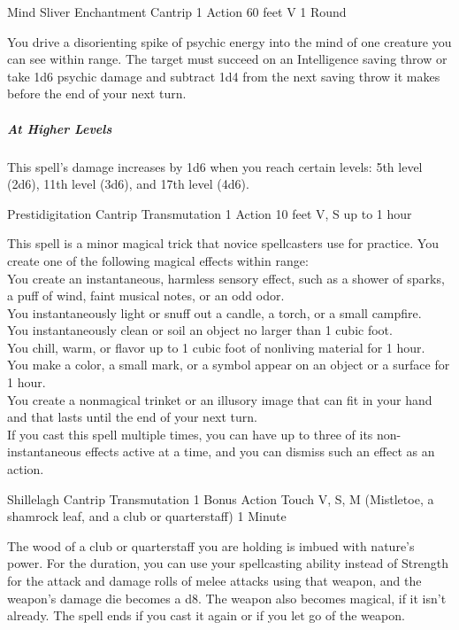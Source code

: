 \documentclass[letterpaper,openany,oneside,twocolumn]{book}
\begin{document}
\DndSpellHeader
  {Mind Sliver}
  {Enchantment Cantrip}
  {1 Action}
  {60 feet}
  {V}
  {1 Round}
  
You drive a disorienting spike of psychic energy into the mind of one creature you can see within range. The target must succeed on an Intelligence saving throw or take 1d6 psychic damage and subtract 1d4 from the next saving throw it makes before the end of your next turn.

\subparagraph*{At Higher Levels} This spell's damage increases by 1d6 when you reach certain levels: 5th level (2d6), 11th level (3d6), and 17th level (4d6).

\DndSpellHeader
  {Prestidigitation}
  {Cantrip Transmutation}
  {1 Action}
  {10 feet}
  {V, S}
  {up to 1 hour}

This spell is a minor magical trick that novice spellcasters use for practice. You create one of the following magical effects within range:\\
You create an instantaneous, harmless sensory effect, such as a shower of sparks, a puff of wind, faint musical notes, or an odd odor.\\
You instantaneously light or snuff out a candle, a torch, or a small campfire.\\
You instantaneously clean or soil an object no larger than 1 cubic foot.\\
You chill, warm, or flavor up to 1 cubic foot of nonliving material for 1 hour.\\
You make a color, a small mark, or a symbol appear on an object or a surface for 1 hour.\\
You create a nonmagical trinket or an illusory image that can fit in your hand and that lasts until the end of your next turn.\\
If you cast this spell multiple times, you can have up to three of its non-instantaneous effects active at a time, and you can dismiss such an effect as an action.

\DndSpellHeader
  {Shillelagh}
  {Cantrip Transmutation}
  {1 Bonus Action}
  {Touch}
  {V, S, M (Mistletoe, a shamrock leaf, and a club or quarterstaff)}
  {1 Minute}
  
The wood of a club or quarterstaff you are holding is imbued with nature's power. For the duration, you can use your spellcasting ability instead of Strength for the attack and damage rolls of melee attacks using that weapon, and the weapon's damage die becomes a d8. The weapon also becomes magical, if it isn't already. The spell ends if you cast it again or if you let go of the weapon.
\end{document}

